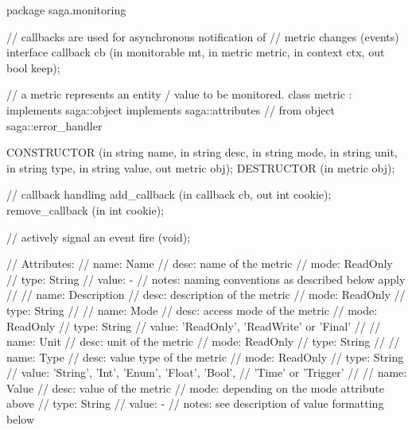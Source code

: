  \begin{myspec}
  package saga.monitoring
  {
    // callbacks are used for asynchronous notification of
    // metric changes (events)
    interface callback
    {
      cb               (in  monitorable     mt,
                        in  metric          metric,
                        in  context         ctx,
                        out bool            keep);
    }
 
 
    // a metric represents an entity / value to be monitored.
    class metric : implements   saga::object
                   implements   saga::attributes
                // from object  saga::error_handler
    {
      CONSTRUCTOR        (in  string          name,
                          in  string          desc,
                          in  string          mode,
                          in  string          unit,
                          in  string          type,
                          in  string          value,
                          out metric          obj);
      DESTRUCTOR         (in  metric          obj);
 
      // callback handling
      add_callback       (in  callback        cb,
                          out int             cookie);
      remove_callback    (in  int             cookie);
 
      // actively signal an event
      fire               (void);
 
 
      // Attributes:
      //   name:  Name
      //   desc:  name of the metric
      //   mode:  ReadOnly
      //   type:  String
      //   value: -
      //   notes: naming conventions as described below apply
      //
      //   name:  Description
      //   desc:  description of the metric
      //   mode:  ReadOnly
      //   type:  String
      //
      //   name:  Mode
      //   desc:  access mode of the metric
      //   mode:  ReadOnly
      //   type:  String
      //   value: 'ReadOnly', 'ReadWrite' or 'Final'
      //
      //   name:  Unit
      //   desc:  unit of the metric
      //   mode:  ReadOnly
      //   type:  String
      //
      //   name:  Type
      //   desc:  value type of the metric
      //   mode:  ReadOnly
      //   type:  String
      //   value: 'String', 'Int', 'Enum', 'Float', 'Bool', 
      //          'Time' or 'Trigger'
      //
      //   name:  Value
      //   desc:  value of the metric
      //   mode:  depending on the mode attribute above
      //   type:  String
      //   value: -
      //   notes: see description of value formatting below
    }
 
}
\end{myspec}
